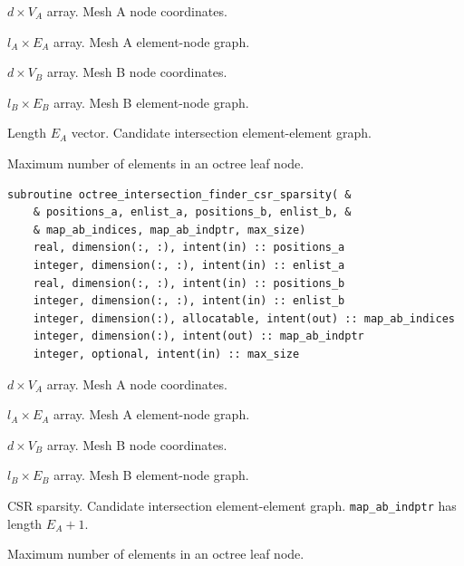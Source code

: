 \documentclass{article}
\begin{document}
\begin{description}[font=\ttfamily\bfseries,leftmargin=2.2\parindent,labelindent=1.7\parindent,noitemsep]
  \item[positions\_a] $d \times V_A$ array. Mesh A node coordinates.
  \item[enlist\_a] $l_A \times E_A$ array. Mesh A element-node graph.
  \item[positions\_b] $d \times V_B$ array. Mesh B node coordinates.
  \item[enlist\_b] $l_B \times E_B$ array. Mesh B element-node graph.
  \item[map\_ab] Length $E_A$ vector. Candidate intersection element-element
    graph.
  \item[max\_size] Maximum number of elements in an octree leaf node.
\end{description}
  
\begin{lstlisting}[language=FORTRAN]
  subroutine octree_intersection_finder_csr_sparsity( &
    & positions_a, enlist_a, positions_b, enlist_b, &
    & map_ab_indices, map_ab_indptr, max_size)
    real, dimension(:, :), intent(in) :: positions_a
    integer, dimension(:, :), intent(in) :: enlist_a
    real, dimension(:, :), intent(in) :: positions_b
    integer, dimension(:, :), intent(in) :: enlist_b
    integer, dimension(:), allocatable, intent(out) :: map_ab_indices
    integer, dimension(:), intent(out) :: map_ab_indptr
    integer, optional, intent(in) :: max_size
\end{lstlisting}

\begin{description}[font=\ttfamily\bfseries,leftmargin=2.2\parindent,labelindent=1.7\parindent,noitemsep]
  \item[positions\_a] $d \times V_A$ array. Mesh A node coordinates.
  \item[enlist\_a] $l_A \times E_A$ array. Mesh A element-node graph.
  \item[positions\_b] $d \times V_B$ array. Mesh B node coordinates.
  \item[enlist\_b] $l_B \times E_B$ array. Mesh B element-node graph.
  \item[map\_ab\_indices, map\_ab\_indptr] CSR sparsity. Candidate intersection
    element-element graph. \linebreak \verb+map_ab_indptr+ has length $E_A + 1$.
  \item[max\_size] Maximum number of elements in an octree leaf node.
\end{description}
\end{document}
